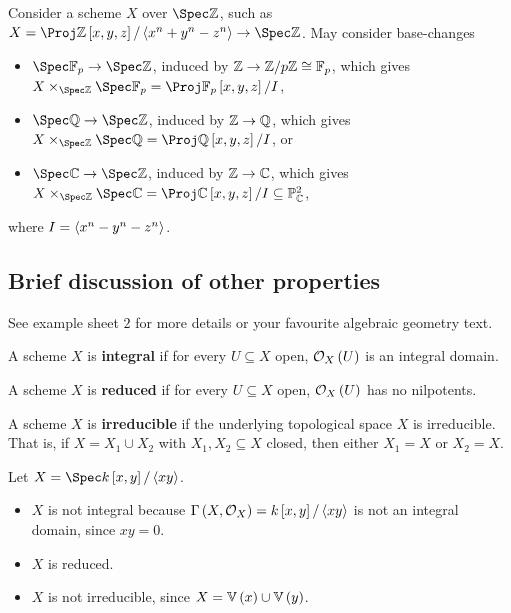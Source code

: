 \begin{example*}
Consider a scheme $ X $ over $ \Spec \ZZ $, such as $ X = \Proj \ZZ\sbr{x, y, z} / \abr{x^n + y^n - z^n} \to \Spec \ZZ $. May consider base-changes
\begin{itemize}
\item $ \Spec \FF_p \to \Spec \ZZ $, induced by $ \mathbb{Z} \to \mathbb{Z} / p\mathbb{Z} \cong \mathbb{F}_p $, which gives $ X \times_{\Spec \ZZ} \Spec \FF_p = \Proj \FF_p\sbr{x, y, z} / I $,
\item $ \Spec \QQ \to \Spec \ZZ $, induced by $ \mathbb{Z} \to \mathbb{Q} $, which gives $ X \times_{\Spec \ZZ} \Spec \QQ = \Proj \QQ\sbr{x, y, z} / I $, or
\item $ \Spec \CC \to \Spec \ZZ $, induced by $ \mathbb{Z} \to \mathbb{C} $, which gives $ X \times_{\Spec \ZZ} \Spec \CC = \Proj \CC\sbr{x, y, z} / I \subseteq \PP_\CC^2 $,
\end{itemize}
where $ I = \left\langle x^n - y^n - z^n \right\rangle $.
\end{example*}

\subsection{Brief discussion of other properties}

See example sheet $ 2 $ for more details or your favourite algebraic geometry text.

\begin{definition*}
A scheme $ X $ is \textbf{integral} if for every $ U \subseteq X $ open, $ \OOO_X\br{U} $ is an integral domain.
\end{definition*}

\begin{definition*}
A scheme $ X $ is \textbf{reduced} if for every $ U \subseteq X $ open, $ \OOO_X\br{U} $ has no nilpotents.
\end{definition*}

\begin{definition*}
A scheme $ X $ is \textbf{irreducible} if the underlying topological space $ X $ is irreducible. That is, if $ X = X_1 \cup X_2 $ with $ X_1, X_2 \subseteq X $ closed, then either $ X_1 = X $ or $ X_2 = X $.
\end{definition*}

\begin{example*}
Let $ X = \Spec k\sbr{x, y} / \abr{xy} $.
\begin{itemize}
\item $ X $ is not integral because $ \Gamma\br{X, \OOO_X} = k\sbr{x, y} / \abr{xy} $ is not an integral domain, since $ xy = 0 $.
\item $ X $ is reduced.
\item $ X $ is not irreducible, since $ X = \VV\br{x} \cup \VV\br{y} $.
\end{itemize}
\end{example*}

